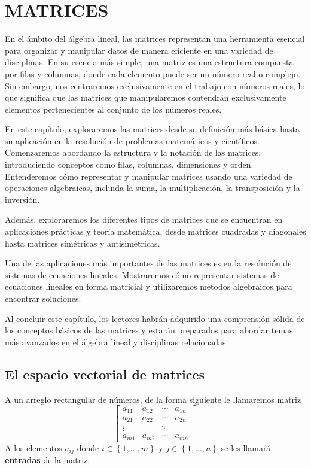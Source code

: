 \chapter{MATRICES}\label{chap:matrices}
\printchaptertableofcontents

En el ámbito del álgebra lineal, las matrices representan una herramienta esencial para organizar y manipular datos de manera eficiente en una variedad de disciplinas. En su esencia más simple, una matriz es una estructura compuesta por filas y columnas, donde cada elemento puede ser un número real o complejo. Sin embargo, nos centraremos exclusivamente en el trabajo con números reales, lo que significa que las matrices que manipularemos contendrán exclusivamente elementos pertenecientes al conjunto de los números reales.

En este capítulo, exploraremos las matrices desde su definición más básica hasta su aplicación en la resolución de problemas matemáticos y científicos. Comenzaremos abordando la estructura y la notación de las matrices, introduciendo conceptos como filas, columnas, dimensiones y orden. Entenderemos cómo representar y manipular matrices usando una variedad de operaciones algebraicas, incluida la suma, la multiplicación, la transposición y la inversión.

Además, exploraremos los diferentes tipos de matrices que se encuentran en aplicaciones prácticas y teoría matemática, desde matrices cuadradas y diagonales hasta matrices simétricas y antisimétricas.

Una de las aplicaciones más importantes de las matrices es en la resolución de sistemas de ecuaciones lineales. Mostraremos cómo representar sistemas de ecuaciones lineales en forma matricial y utilizaremos métodos algebraicos para encontrar soluciones.

Al concluir este capítulo, los lectores habrán adquirido una comprensión sólida de los conceptos básicos de las matrices y estarán preparados para abordar temas más avanzados en el álgebra lineal y disciplinas relacionadas.

\section{El espacio vectorial de matrices}

\begin{definition}
    A un arreglo rectangular de números, de la forma siguiente le llamaremos matriz
    $$\begin{bmatrix}
        a_{11} & a_{12} & \cdots & a_{1n} \\
        a_{21} & a_{22} & \cdots & a_{2n} \\
        \vdots &  & \ddots & \\
        a_{m1} & a_{m2} & \cdots & a_{mn}
    \end{bmatrix}$$
    A los elementos $a_{ij}$ donde $i \in \left\lbrace 1, \dots, m \right\rbrace$ y $j \in \left\lbrace 1, \dots, n \right\rbrace$ se les llamará \textbf{entradas} de la matriz.
\end{definition}

